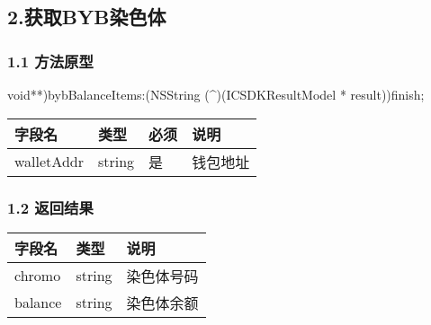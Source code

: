 \documentclass[letterpaper,10pt,english]{sphinxmanual}
\begin{document}
\subsection{2.获取BYB染色体}
\label{\detokenize{BCBWalletSDK_u63a5_u53e3_u8bf4_u660e:id89}}

\subsubsection{1.1 方法原型}
\label{\detokenize{BCBWalletSDK_u63a5_u53e3_u8bf4_u660e:id90}}
\sphinxstylestrong{-(}void**)bybBalanceItems:(NSString (\textasciicircum{})(ICSDKResultModel * result))finish;



\begin{savenotes}\sphinxattablestart
\centering
\begin{tabulary}{\linewidth}[t]{|T|T|T|T|}
\hline
\sphinxstyletheadfamily 
字段名
&\sphinxstyletheadfamily 
类型
&\sphinxstyletheadfamily 
必须
&\sphinxstyletheadfamily 
说明
\\
\hline
walletAddr
&
string
&
是
&
钱包地址
\\
\hline
\end{tabulary}
\par
\sphinxattableend\end{savenotes}


\subsubsection{1.2 返回结果}
\label{\detokenize{BCBWalletSDK_u63a5_u53e3_u8bf4_u660e:id91}}

\begin{sphinxVerbatim}[commandchars=\\\{\}]
     
\end{sphinxVerbatim}



\begin{savenotes}\sphinxattablestart
\centering
\begin{tabulary}{\linewidth}[t]{|T|T|T|}
\hline
\sphinxstyletheadfamily 
字段名
&\sphinxstyletheadfamily 
类型
&\sphinxstyletheadfamily 
说明
\\
\hline
chromo
&
string
&
染色体号码
\\
\hline
balance
&
string
&
染色体余额
\\
\hline
\end{tabulary}
\par
\sphinxattableend\end{savenotes}
\end{document}
